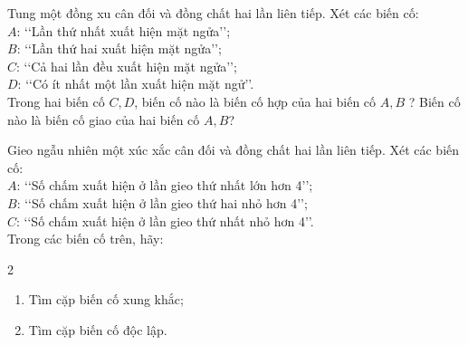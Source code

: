 \begin{bt}%
	Tung một đồng xu cân đối và đồng chất hai lần liên tiếp. Xét các biến cố:\\
	$A$: \lq\lq Lần thứ nhất xuất hiện mặt ngửa\rq\rq;\\
	$B$: \lq\lq Lần thứ hai xuất hiện mặt ngửa\rq\rq;\\
	$C$: \lq\lq Cả hai lần đều xuất hiện mặt ngửa\rq\rq;\\
	$D$: \lq\lq Có ít nhất một lần xuất hiện mặt ngử\rq\rq.\\
	Trong hai biến cố $C, D$, biến cố nào là biến cố hợp của hai biến cố $A, B$ ? Biến cố nào là biến cố giao của hai biến cố $A, B$?
\end{bt}

\begin{bt}%
	Gieo ngẫu nhiên một xúc xắc cân đối và đồng chất hai lần liên tiếp. Xét các biến cố:\\
	$A$: \lq\lq Số chấm xuất hiện ở lần gieo thứ nhất lớn hơn 4\rq\rq ;\\
	$B$: \lq\lq Số chấm xuất hiện ở lần gieo thứ hai nhỏ hơn 4\rq\rq ;\\
	$C$: \lq\lq Số chấm xuất hiện ở lần gieo thứ nhất nhỏ hơn 4\rq\rq.\\
	Trong các biến cố trên, hãy:
	\begin{multicols}{2}
		\begin{enumerate}
			\item Tìm cặp biến cố xung khắc;
			\item Tìm cặp biến cố độc lập.
		\end{enumerate}
	\end{multicols}
\end{bt}

